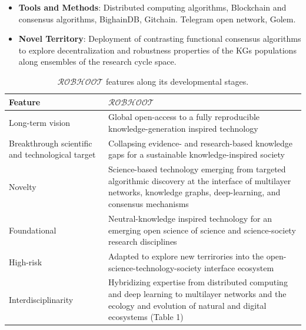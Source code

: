 \documentclass[12pt, a4paper]{article} %
\begin{document}
   \begin{itemize}
   \item {\bf Tools and Methods}: Distributed computing algorithms,
     Blockchain and consensus algorithms, BighainDB,
     Gitchain. Telegram open network, Golem.
 \end{itemize}

 \begin{itemize}
 \item {\bf Novel Territory}: Deployment of contrasting functional
   consensus algorithms to explore decentralization and robustness
   properties of the KGs populations along ensembles of the research
   cycle space.
   \end{itemize}
  

\begin{table}[ht]
\begin{tabular}{ p{3.5cm} | p{14cm}}
  \hline \hline
  \textbf{Feature} &\textbf{$\mathcal{ROBHOOT}$}\\  \hline
  Long-term vision & Global open-access to a fully reproducible knowledge-generation inspired technology \\ \hline
  Breakthrough scientific and technological target & Collapsing evidence- and research-based knowledge gaps for a sustainable knowledge-inspired society\\ \hline
  Novelty & Science-based technology emerging from targeted algorithmic discovery at the interface of multilayer networks, knowledge graphs, deep-learning, and consensus mechanisms\\ \hline
  Foundational & Neutral-knowledge inspired technology for an emerging open science of science and science-society research disciplines \\ \hline
  High-risk & Adapted to explore new terrirories into the open-science-technology-society interface ecosystem \\ \hline
  Interdisciplinarity & Hybridizing expertise from distributed computing and deep learning to multilayer networks and the ecology and evolution of natural and digital ecosystems (Table 1) \\ \hline
  \bottomrule

\end{tabular}
\caption{{\bf $\mathcal{ROBHOOT}$} features along its developmental stages.}
\end{table}
 
\end{document}
